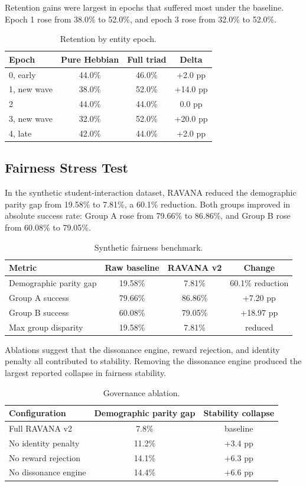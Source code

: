 \documentclass[11pt]{article}
\begin{document}
Retention gains were largest in epochs that suffered most under the baseline. Epoch 1 rose from 38.0\% to 52.0\%, and epoch 3 rose from 32.0\% to 52.0\%.

\begin{table}[h]
\centering
\caption{Retention by entity epoch.}
\begin{tabular}{lccc}
\toprule
Epoch & Pure Hebbian & Full triad & Delta \\
\midrule
0, early & 44.0\% & 46.0\% & +2.0 pp \\
1, new wave & 38.0\% & 52.0\% & +14.0 pp \\
2 & 44.0\% & 44.0\% & 0.0 pp \\
3, new wave & 32.0\% & 52.0\% & +20.0 pp \\
4, late & 42.0\% & 44.0\% & +2.0 pp \\
\bottomrule
\end{tabular}
\end{table}

\subsection{Fairness Stress Test}
In the synthetic student-interaction dataset, RAVANA reduced the demographic parity gap from 19.58\% to 7.81\%, a 60.1\% reduction. Both groups improved in absolute success rate: Group A rose from 79.66\% to 86.86\%, and Group B rose from 60.08\% to 79.05\%.

\begin{table}[h]
\centering
\caption{Synthetic fairness benchmark.}
\begin{tabular}{lccc}
\toprule
Metric & Raw baseline & RAVANA v2 & Change \\
\midrule
Demographic parity gap & 19.58\% & 7.81\% & 60.1\% reduction \\
Group A success & 79.66\% & 86.86\% & +7.20 pp \\
Group B success & 60.08\% & 79.05\% & +18.97 pp \\
Max group disparity & 19.58\% & 7.81\% & reduced \\
\bottomrule
\end{tabular}
\end{table}

Ablations suggest that the dissonance engine, reward rejection, and identity penalty all contributed to stability. Removing the dissonance engine produced the largest reported collapse in fairness stability.

\begin{table}[h]
\centering
\caption{Governance ablation.}
\begin{tabular}{lcc}
\toprule
Configuration & Demographic parity gap & Stability collapse \\
\midrule
Full RAVANA v2 & 7.8\% & baseline \\
No identity penalty & 11.2\% & +3.4 pp \\
No reward rejection & 14.1\% & +6.3 pp \\
No dissonance engine & 14.4\% & +6.6 pp \\
\bottomrule
\end{tabular}
\end{table}
\end{document}
